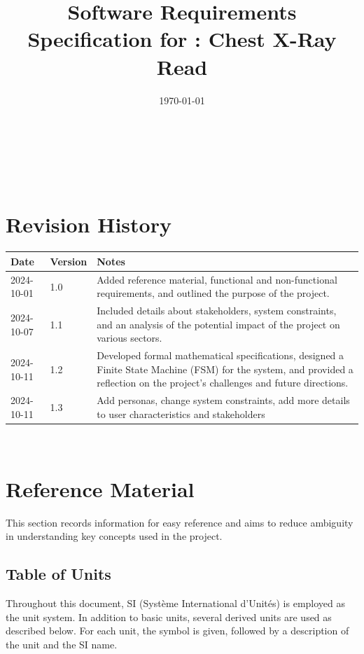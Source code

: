 \documentclass[12pt]{article}
\begin{document}
\title{Software Requirements Specification for \progname: Chest X-Ray Read} 
\author{\authname}
\date{\today}
	
\maketitle

~\newpage
{}
\tableofcontents

~\newpage

\section*{Revision History}

\begin{tabularx}{\textwidth}{p{3cm}p{2cm}X}
  \toprule
  {\bf Date} & {\bf Version} & {\bf Notes}\\
  \midrule
  2024-10-01 & 1.0 & Added reference material, functional and non-functional requirements, and outlined the purpose of the project.\\
  2024-10-07 & 1.1 & Included details about stakeholders, system constraints, and an analysis of the potential impact of the project on various sectors.\\
  2024-10-11 & 1.2 & Developed formal mathematical specifications, designed a Finite State Machine (FSM) for the system, and provided a reflection on the project's challenges and future directions.\\
  2024-10-11 & 1.3 & Add personas, change system constraints, add more details to user characteristics and stakeholders\\
  \bottomrule
  \end{tabularx}


~\newpage

\section{Reference Material}

This section records information for easy reference and aims to reduce ambiguity in understanding key concepts used in the project.

\subsection{Table of Units}

Throughout this document, SI (Système International d'Unités) is employed as the unit system. In addition to basic units, several derived units are used as described below. For each unit, the symbol is given, followed by a description of the unit and the SI name.
\end{document}
